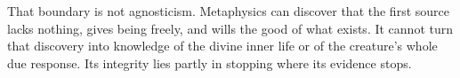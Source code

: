 That boundary is not agnosticism. Metaphysics can discover that the first source lacks nothing, gives being freely, and wills the good of what exists. It cannot turn that discovery into knowledge of the divine inner life or of the creature's whole due response. Its integrity lies partly in stopping where its evidence stops.
